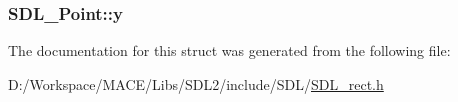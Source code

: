 \subsubsection[{\texorpdfstring{y}{y}}]{ S\+D\+L\+\_\+\+Point\+::y}\hypertarget{struct_s_d_l___point_aaa68aefa869f6bdf46367a70bd9414b0}{}\label{struct_s_d_l___point_aaa68aefa869f6bdf46367a70bd9414b0}


The documentation for this struct was generated from the following file\+:\begin{DoxyCompactItemize}
\item 
D\+:/\+Workspace/\+M\+A\+C\+E/\+Libs/\+S\+D\+L2/include/\+S\+D\+L/\hyperlink{_s_d_l__rect_8h}{S\+D\+L\+\_\+rect.\+h}\end{DoxyCompactItemize}
